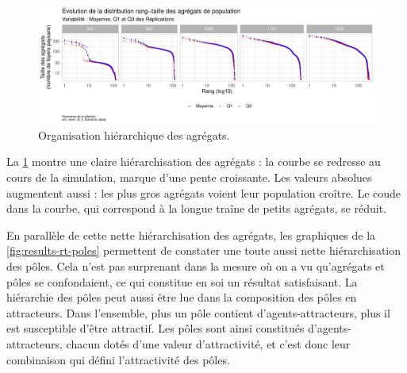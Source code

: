 \begin{figure}[H]
	\centering
	\includegraphics[width=\linewidth]{img/results_6_6/Agregats_RT_Haut.pdf}
	\caption[Hiérarchie des agrégats]{Organisation hiérarchique des agrégats.}
	\label{fig:results-rt-agregats}
\end{figure}

La \cref{fig:results-rt-agregats} montre une claire hiérarchisation des agrégats : la courbe se \og redresse\fg{} au cours de la simulation, marque d'une pente croissante.
Les valeurs absolues augmentent aussi : les plus gros agrégats voient leur population croître.
Le \og coude\fg{} dans la courbe, qui correspond à la longue traîne de petits agrégats, se réduit.

En parallèle de cette nette hiérarchisation des agrégats, les graphiques de la \cref{fig:results-rt-poles} permettent de constater une toute aussi nette hiérarchisation des pôles.
Cela n'est pas surprenant dans la mesure où on a vu qu'agrégats et pôles se confondaient, ce qui constitue en soi un résultat satisfaisant.
La hiérarchie des pôles peut aussi être lue dans la composition des pôles en attracteurs.
Dans l'ensemble, plus un pôle contient d'agents-attracteurs, plus il est susceptible d'être attractif.
Les pôles sont ainsi constitués d'agents-attracteurs, chacun dotés d'une valeur d'attractivité, et c'est donc leur combinaison qui défini l'attractivité des pôles.


